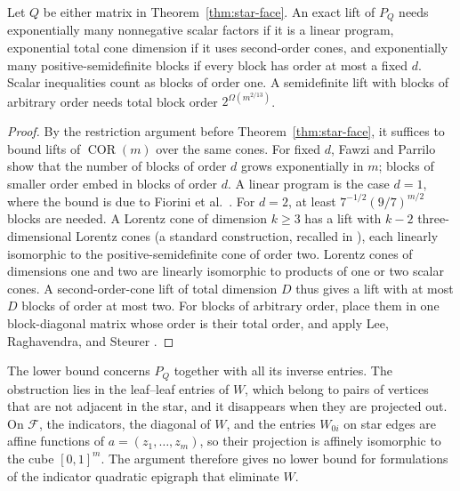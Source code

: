 \begin{corollary}\label{cor:conic}
Let $Q$ be either matrix in Theorem~\ref{thm:star-face}. An exact lift of
$P_Q$ needs exponentially many nonnegative scalar factors if it is a
linear program, exponential total cone dimension if it uses second-order
cones, and exponentially many positive-semidefinite blocks if every block
has order at most a fixed $d$. Scalar inequalities count as blocks of
order one. A semidefinite lift with blocks of arbitrary order needs total
block order $2^{\Omega(m^{2/13})}$.
\end{corollary}
\begin{proof}
By the restriction argument before Theorem~\ref{thm:star-face}, it
suffices to bound lifts of $\operatorname{COR}(m)$ over the same cones.
For fixed $d$, Fawzi and Parrilo \cite[Theorem~1]{FawziParrilo} show
that the number of blocks of order $d$ grows exponentially in $m$;
blocks of smaller order embed in blocks of order $d$. A linear program
is the case $d=1$, where the bound is due to Fiorini et al.\
\cite[Theorem~7]{Fiorini}. For $d=2$, at least $7^{-1/2}(9/7)^{m/2}$
blocks are needed. A Lorentz cone of dimension $k\ge3$ has a lift with
$k-2$ three-dimensional Lorentz cones (a standard construction, recalled
in \cite[p.~3]{FawziParrilo}), each linearly isomorphic to the
positive-semidefinite cone of order two. Lorentz cones of dimensions one
and two are linearly isomorphic to products of one or two scalar cones.
A second-order-cone lift of total dimension $D$ thus gives a lift with at
most $D$ blocks of order at most two. For blocks of arbitrary order,
place them in one block-diagonal matrix whose order is their total
order, and apply Lee, Raghavendra, and Steurer
\cite[Theorems~1.1 and 5.4]{LeeSDP}.
\end{proof}

The lower bound concerns $P_Q$ together with all its inverse entries.
The obstruction lies in the leaf--leaf entries of $W$, which belong to
pairs of vertices that are not adjacent in the star, and it disappears
when they are projected out. On $\mathcal F$, the indicators, the
diagonal of $W$, and the entries $W_{0i}$ on star edges are affine
functions of $a=(z_1,\ldots,z_m)$, so their projection is affinely
isomorphic to the cube $[0,1]^m$. The argument therefore gives no lower
bound for formulations of the indicator quadratic epigraph that
eliminate $W$.

